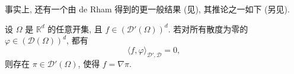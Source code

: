 事实上, 还有一个由 de Rham 得到的更一般结果 (见), 其推论之一如下 (另见).

\begin{Theorem}
\label{thm:chap4-de-rham-distributions}
设 $\Omega$ 是 $\mathbb R^d$ 的任意开集, 且 $f\in(\mathcal D'(\Omega))^d$. 若对所有散度为零的 $\varphi\in(\mathcal D(\Omega))^d$, 都有
\[
 \langle f,\varphi\rangle_{\mathcal D',\mathcal D}=0,
\]
则存在 $\pi\in\mathcal D'(\Omega)$, 使得 $f=\nabla\pi$.
\end{Theorem}
